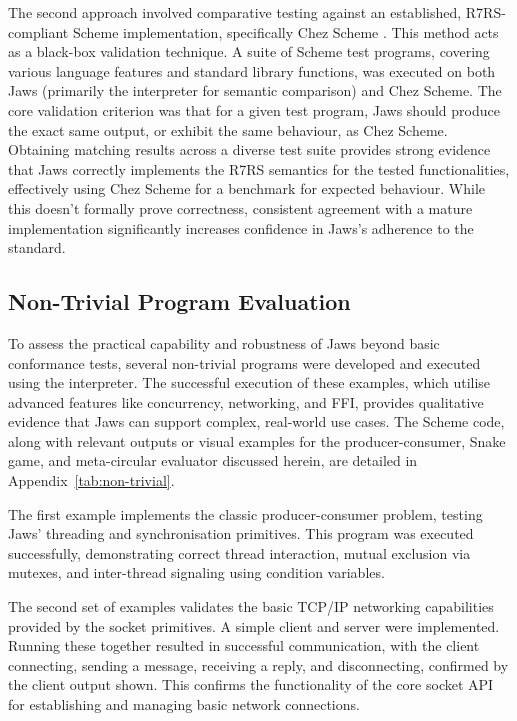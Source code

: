 \documentclass[final]{cmpreport_02}
\begin{document}
The second approach involved comparative testing against an established, R7RS-compliant Scheme implementation, specifically Chez Scheme \cite{chezscheme}. This method acts as a black-box validation technique. A suite of Scheme test programs, covering various language features and standard library functions, was executed on both Jaws (primarily the interpreter for semantic comparison) and Chez Scheme. The core validation criterion was that for a given test program, Jaws should produce the exact same output, or exhibit the same behaviour, as Chez Scheme. Obtaining matching results across a diverse test suite provides strong evidence that Jaws correctly implements the R7RS semantics for the tested functionalities, effectively using Chez Scheme for a benchmark for expected behaviour. While this doesn't formally prove correctness, consistent agreement with a mature implementation significantly increases confidence in Jaws's adherence to the standard.

\subsection{Non-Trivial Program Evaluation}
\label{sec:nontrivial-eval}

To assess the practical capability and robustness of Jaws beyond basic conformance tests, several non-trivial programs were developed and executed using the interpreter. The successful execution of these examples, which utilise advanced features like concurrency, networking, and FFI, provides qualitative evidence that Jaws can support complex, real-world use cases. The Scheme code, along with relevant outputs or visual examples for the producer-consumer, Snake game, and meta-circular evaluator discussed herein, are detailed in Appendix~\ref{tab:non-trivial}.\newline

The first example implements the classic producer-consumer problem, testing Jaws' threading and synchronisation primitives. This program was executed successfully, demonstrating correct thread interaction, mutual exclusion via mutexes, and inter-thread signaling using condition variables.\newline

The second set of examples validates the basic TCP/IP networking capabilities provided by the socket primitives. A simple client and server were implemented. Running these together resulted in successful communication, with the client connecting, sending a message, receiving a reply, and disconnecting, confirmed by the client output shown. This confirms the functionality of the core socket API for establishing and managing basic network connections.\newline
\end{document}

